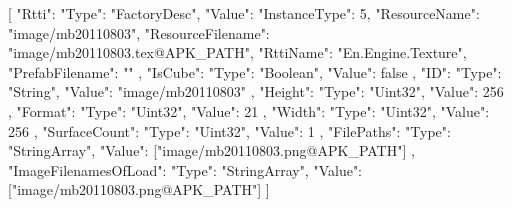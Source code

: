 [{
        "Rtti": {
            "Type": "FactoryDesc",
            "Value": {
                "InstanceType": 5,
                "ResourceName": "image/mb20110803",
                "ResourceFilename": "image/mb20110803.tex@APK_PATH",
                "RttiName": "En.Engine.Texture",
                "PrefabFilename": ""
            }
        },
        "IsCube": {
            "Type": "Boolean",
            "Value": false
        },
        "ID": {
            "Type": "String",
            "Value": "image/mb20110803"
        },
        "Height": {
            "Type": "Uint32",
            "Value": 256
        },
        "Format": {
            "Type": "Uint32",
            "Value": 21
        },
        "Width": {
            "Type": "Uint32",
            "Value": 256
        },
        "SurfaceCount": {
            "Type": "Uint32",
            "Value": 1
        },
        "FilePaths": {
            "Type": "StringArray",
            "Value": ["image/mb20110803.png@APK_PATH"]
        },
        "ImageFilenamesOfLoad": {
            "Type": "StringArray",
            "Value": ["image/mb20110803.png@APK_PATH"]
        }
    }]